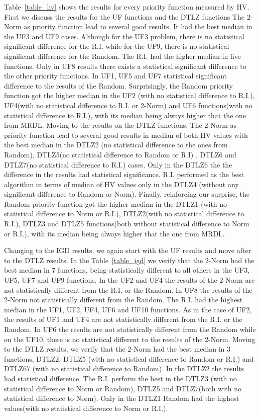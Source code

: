 Table~\ref{table_hv} shows the results for every priority function measured by HV. First we discuss the results for the UF functions and the DTLZ functions The 2-Norm as priority function lead to several good results. It had the best median in the UF3 and UF9 cases. Although for the UF3 problem, there is no statistical significant difference  for the R.I. while for the UF9, there is no statistical significant difference for the Random. The R.I. had the higher median in five functions. Only in UF8 results there exists a statistical significant difference to the other priority functions.  In UF1, UF5 and UF7 statistical significant difference to the results of the Random. Surprisingly, the Random priority function got the higher median in the UF2 (with no statistical difference to R.I.), UF4(with no statistical difference to R.I. or 2-Norm) and UF6 functions(with no statistical difference to R.I.), with its median being always higher that the one from MRDL. Moving to the results on the DTLZ functions. The 2-Norm as priority function lead to several good results in median of both HV values with the best median in the DTLZ2 (no statistical difference to the ones from Random), DTLZ5(no statistical difference to Random or R.I) , DTLZ6 and DTLZ7(no statistical difference to R.I.) cases. Only in the DTLZ6 the the difference in the results had statistical significance. R.I. performed as the best algorithm in terms of median of HV values only in the DTLZ4 (without any significant difference to Random or Norm). Finally, reinforcing our surprise, the Random priority function got the higher median in the DTLZ1 (with no statistical difference to Norm or R.I.), DTLZ2(with no statistical difference to R.I.), DTLZ3 and DTLZ5 functions(both without statistical difference to Norm or R.I.), with its median being always higher that the one from MRDL.

Changing to the IGD results, we again start with the UF results and move after to the DTLZ results. In the Table~\ref{table_igd} we verify that the 2-Norm had the best median in 7 functions, being statistically different to all others in the UF3, UF5, UF7 and UF9 functions. In the UF2 and UF4 the results of the 2-Norm are not statistically different from the R.I. or the Random. In UF8 the results of the 2-Norm not statistically different from the Random. The R.I. had the highest median in the UF1, UF2, UF4, UF6 and UF10 functions. As in the case of UF2, the results of UF1 and UF4 are not statistically different from the R.I. or the Random. In UF6 the results are not statistically different from the Random while on the UF10, there is no statistical different to the results of the 2-Norm. Moving to the DTLZ results, we verify that the 2-Norm had the best median in 3 functions, DTLZ2, DTLZ5 (with no statistical difference to Random or R.I.) and DTLZ67 (with no statistical difference to Random). In the DTLZ2 the results had statistical difference. The R.I. perform the best in the DTLZ3 (with no statistical difference to Norm or Random), DTLZ5 and DTLZ7(both with no statistical difference to Norm). Only in the DTLZ1  Random had the highest values(with no statistical difference to Norm or R.I.).


